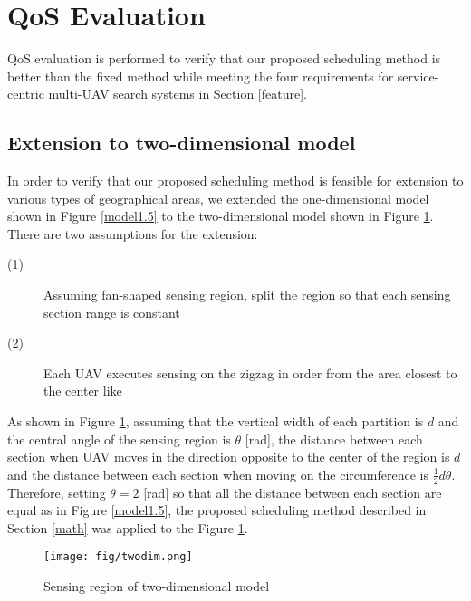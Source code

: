 \documentclass{ieeeaccess}
\begin{document}
\section{QoS Evaluation}
QoS evaluation is performed to verify that our proposed scheduling method is better than the fixed method while meeting the four requirements for service-centric multi-UAV search systems in Section \ref{feature}.

\subsection{Extension to two-dimensional model}\label{twodi}
In order to verify that our proposed scheduling method is feasible for extension to various types of geographical areas, we extended the one-dimensional model shown in Figure \ref{model1.5} to the two-dimensional model shown in Figure \ref{twodimention}.
There are two assumptions for the extension:

\begin{description}

\item[(1)]  Assuming fan-shaped sensing region, split the region so that each sensing section range is constant
\item[(2)] Each UAV executes sensing on the zigzag in order from the area closest to the center like \cite{Maza2007}
\end{description}

As shown in Figure \ref{twodimention}, assuming that the vertical width of each partition is $d$ and the central angle of the sensing region is $\theta$ [rad], the distance between each section when UAV moves in the direction opposite to the center of the region is $d$ and the distance between each section when moving on the circumference is $\frac{1}{2}d\theta$.
Therefore, setting $\theta=2$ [rad] so that all the distance between each section are equal as in Figure \ref{model1.5}, the proposed scheduling method described in Section \ref{math} was applied to the Figure \ref{twodimention}.

\begin{figure}[t]
\begin{center}
\texttt{[image: fig/twodim.png]}
\caption{Sensing region of two-dimensional model}
\label{twodimention}
\end{center}
\end{figure}
\end{document}
